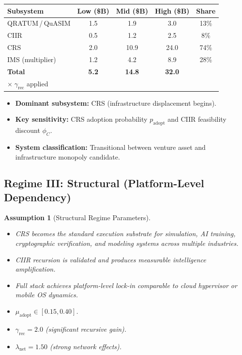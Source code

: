 \documentclass[11pt,a4paper]{article}
\newtheorem{assumption}[definition]{Assumption}
\theoremstyle{remark}
\begin{document}
\begin{center}
\renewcommand{\arraystretch}{1.3}
\begin{tabular}{lcccc}
\toprule
\textbf{Subsystem} & \textbf{Low (\$B)} & \textbf{Mid (\$B)} & \textbf{High (\$B)} & \textbf{Share} \\
\midrule
QRATUM\,/\,QuASIM & 1.5  & 1.9  & 3.0  & 13\%  \\
CIIR               & 0.5  & 1.2  & 2.5  & 8\%   \\
CRS                & 2.0  & 10.9 & 24.0 & 74\%  \\
IMS (multiplier)   & 1.2  & 4.2  & 8.9  & 28\%  \\
\midrule
\textbf{Total}     & \textbf{5.2} & \textbf{14.8} & \textbf{32.0} & \\
$\times\;\gamma_{\mathrm{rec}}$ applied & & & & \\
\bottomrule
\end{tabular}
\end{center}

\begin{itemize}[nosep]
  \item \textbf{Dominant subsystem:} CRS (infrastructure displacement
        begins).
  \item \textbf{Key sensitivity:} CRS adoption probability
        $p_{\mathrm{adopt}}$ and CIIR feasibility discount $\phi_C$.
  \item \textbf{System classification:} Transitional between venture
        asset and infrastructure monopoly candidate.
\end{itemize}

\subsection{Regime III: Structural (Platform-Level Dependency)}
\label{subsec:structural}

\begin{assumption}[Structural Regime Parameters]
\label{ass:structural}
\begin{itemize}[nosep]
  \item CRS becomes the standard execution substrate for simulation,
        AI training, cryptographic verification, and modeling systems
        across multiple industries.
  \item CIIR recursion is validated and produces measurable
        intelligence amplification.
  \item Full stack achieves platform-level lock-in comparable to
        cloud hypervisor or mobile OS dynamics.
  \item $\mu_{\mathrm{adopt}} \in [0.15, 0.40]$.
  \item $\gamma_{\mathrm{rec}} = 2.0$ (significant recursive gain).
  \item $\lambda_{\mathrm{net}} = 1.50$ (strong network effects).
\end{itemize}
\end{assumption}
\end{document}
